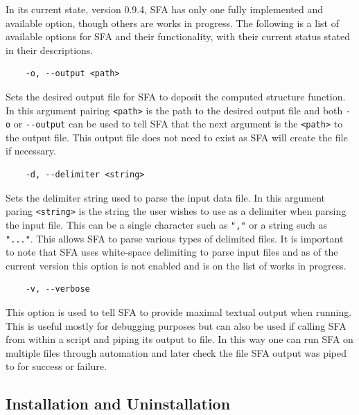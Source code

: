 \documentclass[12pt, oneside]{smuthesis}
\begin{document}
In its current state, version 0.9.4, SFA has only one fully implemented and available option, though others are works in progress. The following is a list of available options for SFA and their functionality, with their current status stated in their descriptions.
\begin{center}
	\begin{BVerbatim}
	-o, --output <path>
	\end{BVerbatim}
\end{center}
Sets the desired output file for SFA to deposit the computed structure function. In this argument pairing \verb|<path>| is the path to the desired output file and both \verb|-o| or \verb|--output| can be used to tell SFA that the next argument is the \verb|<path>| to the output file. This output file does not need to exist as SFA will create the file if necessary.
\begin{center}
	\begin{BVerbatim}
	-d, --delimiter <string>
	\end{BVerbatim}
\end{center}
Sets the delimiter string used to parse the input data file. In this argument paring \verb|<string>| is the string the user wishes to use as a delimiter when parsing the input file. This can be a single character such as \verb|","| or a string such as \verb|"..."|. This allows SFA to parse various types of delimited files. It is important to note that SFA uses white-space delimiting to parse input files and as of the current version this option is not enabled and is on the list of works in progress.
\begin{center}
	\begin{BVerbatim}
	-v, --verbose
	\end{BVerbatim}
\end{center}
This option is used to tell SFA to provide maximal textual output when running. This is useful mostly for debugging purposes but can also be used if calling SFA from within a script and piping its output to file. In this way one can run SFA on multiple files through automation and later check the file SFA output was piped to for success or failure.

\subsection{\sc Installation and Uninstallation}
\end{document}
